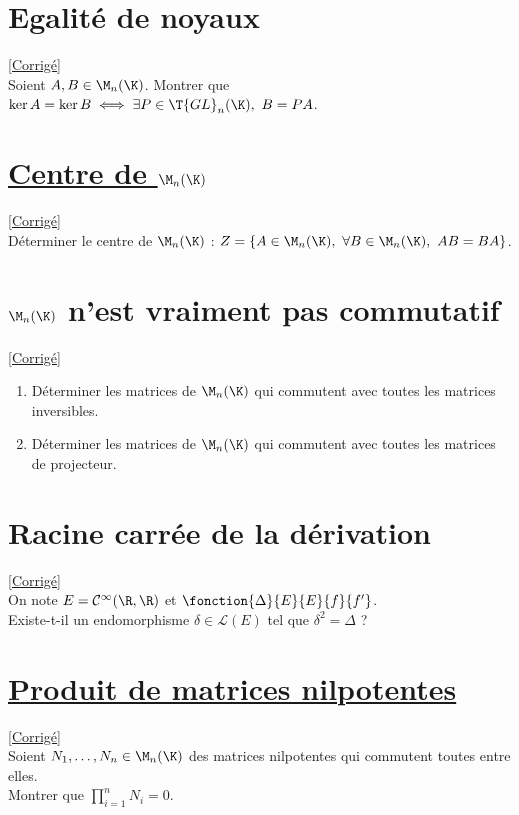 \documentclass[8pt]{book}
\begin{document}
\section{Egalité de noyaux }
\label{Egalité de noyaux}
\textcolor{blue}{\hyperref[Egalité de noyaux corrigé]{[Corrigé]}}\\
Soient $A,B\in \M_n(\K)$. Montrer que $\ker A=\ker B\iff \exists P\in \T{GL}_n(\K),\ B=PA$.

\section{\underline{Centre de $\M_n(\K)$} }
\label{Centre de Mn(K)}
\textcolor{blue}{\hyperref[Centre de Mn(K) corrigé]{[Corrigé]}}\\
Déterminer le centre de $\M_n(\K)$ : $Z=\{A\in \M_n(\K),\ \forall B\in \M_n(\K),\ AB=BA\}$.

\section{$\M_n(\K)$ n'est vraiment pas commutatif }
\label{Mn(K) n'est vraiment pas commutatif corrigé}
\textcolor{blue}{\hyperref[Mn(K) n'est vraiment pas commutatif]{[Corrigé]}}\\
\begin{enumerate}
	\item Déterminer les matrices de $\M_n(\K)$ qui commutent avec toutes les matrices inversibles.
	\item Déterminer les matrices de $\M_n(\K)$ qui commutent avec toutes les matrices de projecteur.
\end{enumerate}

\section{Racine carrée de la dérivation }
\label{Racine carrée de la dérivation}
\textcolor{blue}{\hyperref[Racine carrée de la dérivation corrigé]{[Corrigé]}}\\
On note $E=\mathcal C^\infty(\R,\R)$ et $\fonction{\Delta}{E}{E}{f}{f'}$.\\
Existe-t-il un endomorphisme $\delta\in \mathcal L(E)$ tel que $\delta^2=\Delta$ ?

\section{\underline{Produit de matrices nilpotentes} }
\label{Produit de matrices nilpotentes}
\textcolor{blue}{\hyperref[Produit de matrices nilpotentes corrigé]{[Corrigé]}}\\
Soient $N_1,\dots,N_n\in \M_n(\K)$ des matrices nilpotentes qui commutent toutes entre elles.\\
Montrer que $\displaystyle\prod_{i=1}^nN_i=0$.
\end{document}
